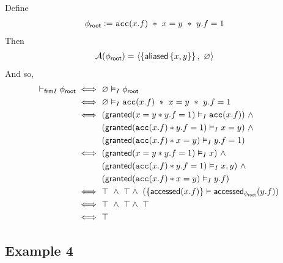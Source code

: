 Define
\begin{align*}
{\phi_\textsf{root}} := & \ \texttt{acc}(x.f) \ \ast \ x = y \ \ast \ y.f = 1
\end{align*}
Then
\begin{align*}
\mathcal{A}({\phi_\textsf{root}}) = & \ \langle  \left\{  \textsf{aliased}\left\{ x,y \right\} \right\}  ,\ \varnothing \rangle
\end{align*}
And so,
\begin{align*}
\vdash_{\textsf{frm}I} {\phi_\textsf{root}}
\iff & \
\varnothing \vDash_I {\phi_\textsf{root}}
\\ \iff & \
\varnothing \vDash_I \texttt{acc}(x.f) \ \ast \ x = y \ \ast \ y.f = 1
\\ \iff & \
( \textsf{granted}(x = y \ast y.f = 1) \vDash_I \texttt{acc}(x.f) ) \ \land \\ & \
( \textsf{granted}(\texttt{acc}(x.f) \ast y.f = 1) \vDash_I x = y ) \ \land \\ & \
( \textsf{granted}(\texttt{acc}(x.f) \ast x = y) \vDash_I y.f = 1 )
\\ \iff & \
( \textsf{granted}(x = y \ast y.f = 1) \vDash_I x ) \ \land \\ & \
( \textsf{granted}(\texttt{acc}(x.f) \ast y.f = 1) \vDash_I x, y ) \ \land \\ & \
( \textsf{granted}(\texttt{acc}(x.f) \ast x = y) \vDash_I y.f )
\\ \iff & \
\top \ \land \ \top \land \ ( \left\{  \textsf{accessed}(x.f)  \right\} \vdash \textsf{accessed}_{{\phi_\textsf{root}}}(y.f) )
\\ \iff & \
\top \ \land \ \top \land \ \top
\\ \iff & \
\top
\end{align*}

\newpage
\subsection*{Example 4}

